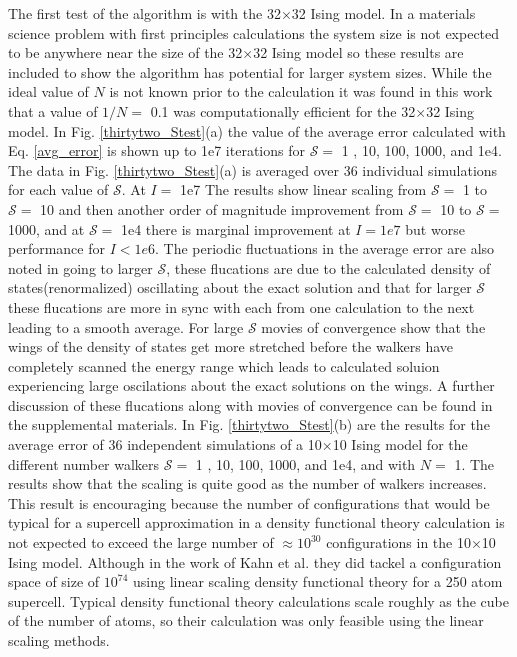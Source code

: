 \documentclass[aps,pre,reprint,superscriptaddress,showkeys]{revtex4-1}
\begin{document}
The first test of the algorithm is with the 32$\times$32 Ising model. In a materials science problem with first principles calculations the system size is not expected to be anywhere near the size of the  32$\times$32 Ising model so these results are included to show the algorithm has potential for larger system sizes. While the ideal value of $N$ is not known prior to the calculation it was found in this work that a value of $1/N=$ 0.1 was computationally efficient for the 32$\times$32 Ising model. In Fig. \ref{thirtytwo_Stest}(a) the value of the average error calculated with Eq. \ref{avg_error} is shown up to 1e7 iterations for $\mathcal{S}=$ 1 , 10, 100, 1000, and 1e4. The data in Fig. \ref{thirtytwo_Stest}(a) is averaged over 36 individual simulations for each value of $\mathcal{S}$. At $I=$ 1e7 The results show linear scaling from $\mathcal{S}=$ 1 to $\mathcal{S}=$ 10 and then another order of magnitude improvement from $\mathcal{S}=$ 10 to $\mathcal{S}=$ 1000, and at $\mathcal{S}=$ 1e4 there is marginal improvement at $I=1e7$ but worse performance for $I<1e6$.  The periodic fluctuations in the average error are also noted in going to larger $\mathcal{S}$, these flucations are due to the calculated density of states(renormalized) oscillating about the exact solution and that for larger $\mathcal{S}$  these flucations are more in sync with each from one calculation to the next leading to a smooth average. For large $\mathcal{S}$ movies of convergence show that the wings of the density of states get more stretched before the walkers have completely scanned the energy range which leads to calculated soluion experiencing large oscilations about the exact solutions on the wings. A further discussion of these flucations along with movies of convergence can be found in the supplemental materials.  In Fig. \ref{thirtytwo_Stest}(b) are  the results for the average error of 36 independent simulations of a 10$\times$10 Ising model for the different number walkers $\mathcal{S}=$ 1 , 10, 100, 1000, and 1e4, and  with $N=$ 1. The results show that the scaling is quite good as the number of walkers increases. This result is encouraging because the number of configurations that would be typical for a supercell approximation in a density functional theory calculation is not expected to exceed the large number of $\approx 10^{30}$ configurations in the 10$\times$10 Ising model.  Although in the work of  Kahn et al. \cite{FP_Wang_Landau_CuZn} they did tackel a configuration space of size of $ 10^{74}$ using linear scaling density functional theory for a 250 atom supercell. Typical density functional theory calculations scale roughly as the cube of the number of atoms, so their calculation was only feasible using the linear scaling methods.   
\end{document}
